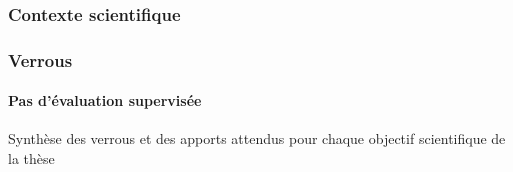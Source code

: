 \subsubsection{Contexte scientifique}

\subsubsection{Verrous}

\paragraph{Pas d'évaluation supervisée}


\begin{table}
  \centering
  
  \caption{Synthèse des verrous et des apports attendus pour chaque
    objectif scientifique de la thèse}
  \label{tab:synthese_objectifs}
\end{table}

